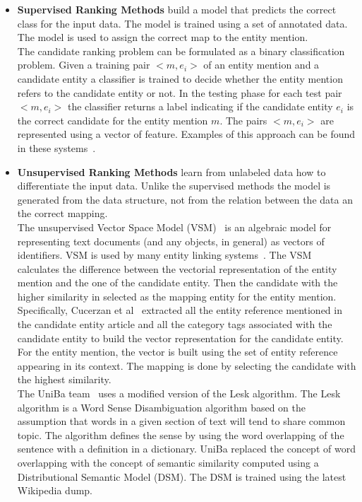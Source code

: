 \begin{itemize}[topsep=10pt]
\item \textbf{Supervised Ranking Methods} build a model that predicts the correct class for the input data. The model is trained using a set of annotated data. The model is used to assign the correct map to the entity mention.\\
\newline
The candidate ranking problem can be formulated as a binary classification problem. Given a training pair $<\!\!m, e_i\!\!>$ of an entity mention and a candidate entity a classifier is trained to decide whether the entity mention refers to the candidate entity or not. In the testing phase for each test pair $<\!\!m, e_i\!\!>$ the classifier returns a label indicating if the candidate entity $e_i$ is the correct candidate for the entity mention $m$. The pairs $<\!\!m, e_i\!\!>$ are represented using a vector of feature. Examples of this approach can be found in these systems~\cite{hoffart2011robust, guo2013link}.

\item \textbf{Unsupervised Ranking Methods} learn from unlabeled data how to differentiate the input data. Unlike the supervised methods the model is generated from the data structure, not from the relation between the data an the correct mapping. \\
\newline
The unsupervised Vector Space Model (VSM)~\cite{salton1975vector} is an algebraic model for representing text documents (and any objects, in general) as vectors of identifiers. VSM is used by many entity linking systems~\cite{cucerzan2007large}. The VSM calculates the difference between the vectorial representation of the entity mention and the one of the candidate entity. Then the candidate with the higher similarity in selected as the mapping entity for the entity mention. Specifically, Cucerzan et al~\cite{cucerzan2007large} extracted all the entity reference mentioned in the candidate entity article and all the category tags associated with the candidate entity to build the vector representation for the candidate entity. For the entity mention, the vector is built using the set of entity reference appearing in its context. The mapping is done by selecting the candidate with the highest similarity.\\
\newline
The UniBa team~\cite{basile2015uniba} uses a modified version of the Lesk algorithm. The Lesk algorithm is a Word Sense Disambiguation algorithm based on the assumption that words in a given section of text will tend to share common topic. The algorithm defines the sense by using the word overlapping of the sentence with a definition in a dictionary. UniBa replaced the concept of word overlapping with the concept of semantic similarity computed using a Distributional Semantic Model (DSM). The DSM is trained using the latest Wikipedia dump.
\end{itemize}
\pagebreak
